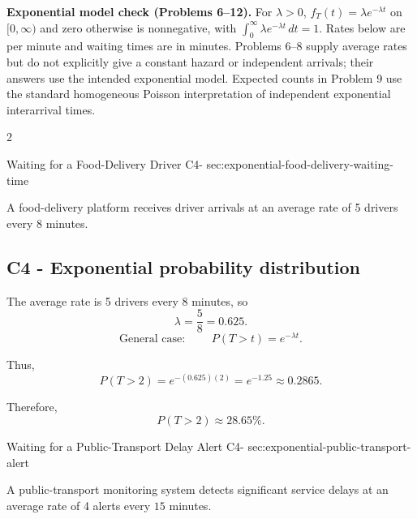	    \noindent\textbf{Exponential model check (Problems 6--12).}
    For \(\lambda>0\), \(f_T(t)=\lambda e^{-\lambda t}\) on \([0,\infty)\)
    and zero otherwise is nonnegative, with
    \(\int_0^\infty\lambda e^{-\lambda t}\,dt=1\).
    Rates below are per minute and waiting times are in minutes.
    Problems 6--8 supply average rates but do not explicitly give a constant
    hazard or independent arrivals; their answers use the intended exponential
    model. Expected counts in Problem 9 use the standard homogeneous Poisson
    interpretation of independent exponential interarrival times.

	\newpage
	\begin{multicols}{2}
		
		\sectionScored
		{Waiting for a Food-Delivery Driver}
		{C4-}
		{sec:exponential-food-delivery-waiting-time}
		{
			A food-delivery platform receives driver arrivals at an
			average rate of 5 drivers every \(8\) minutes.
			
			
			\label{subsec:exponential-food-delivery-probability}
			\subsection*{C4 - Exponential probability distribution }
			
			The average rate is 5 drivers every \(8\) minutes, so
			\[
			\lambda=\frac{5}{8}=0.625.
			\]
			\[
			\text{General case: } \qquad P(T>t)=e^{-\lambda t}.
			\]
			
			Thus,
			\[
			P(T>2)
			=e^{-(0.625)(2)}
			=e^{-1.25}
			\approx0.2865.
			\]
			
			Therefore,
			\[
			\boxed{P(T>2)\approx28.65\%}.
			\]
			
			\vspace{-5mm}
		}
		
		\sectionScored
		{Waiting for a Public-Transport Delay Alert}
		{C4-}
		{sec:exponential-public-transport-alert}
		{
			A public-transport monitoring system detects significant service delays
			at an average rate of 4 alerts every \(15\) minutes.
			
}
\end{multicols}
